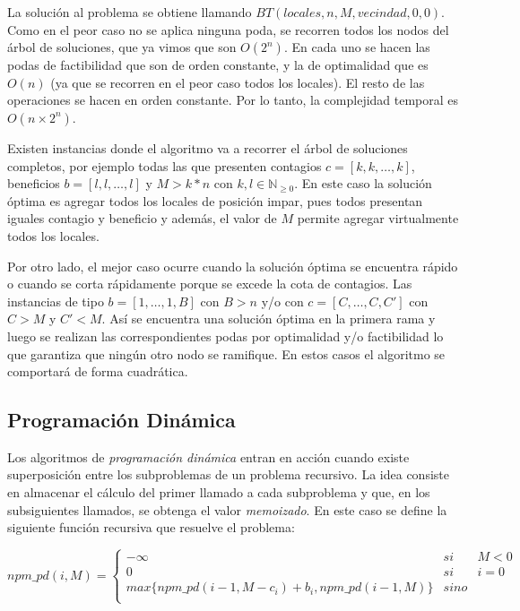 La solución al problema se obtiene llamando $BT(locales, n, M, vecindad, 0, 0)$. Como en el peor caso no se aplica ninguna poda, se recorren todos los nodos del árbol de soluciones, que ya vimos que son $O(2^n)$. En cada uno se hacen las podas de factibilidad que son de orden constante, y la de optimalidad que es $O(n)$ (ya que se recorren en el peor caso todos los locales). El resto de las operaciones se hacen en orden constante. Por lo tanto, la complejidad temporal es $O(n \times 2^n)$.

Existen instancias donde el algoritmo va a recorrer el árbol de soluciones completos, por ejemplo todas las que presenten contagios $c=[k,k,\dots,k]$, beneficios $b=[l,l,\dots,l]$ y $M>k*n$ con $k,l \in \mathbb{N}_{\ge 0}$. En este caso la solución óptima es agregar todos los locales de posición impar, pues todos presentan iguales contagio y beneficio y además, el valor de $M$ permite agregar virtualmente todos los locales.

Por otro lado, el mejor caso ocurre cuando la solución óptima se encuentra rápido o cuando se corta rápidamente porque se excede la cota de contagios. Las instancias de tipo $b=[1,\dots,1,B]$ con $B>n$ y/o con $c=[C,\dots,C,C']$ con $C>M$ y $C'<M$. Así se encuentra una solución óptima en la primera rama y luego se realizan las correspondientes podas por optimalidad y/o factibilidad lo que garantiza que ningún otro nodo se ramifique. En estos casos el algoritmo se comportará de forma cuadrática.

\subsection{Programación Dinámica}

Los algoritmos de \textit{programación dinámica} entran en acción cuando existe superposición entre los subproblemas de un problema recursivo. La idea consiste en almacenar el cálculo del primer llamado a cada subproblema y que, en los subsiguientes llamados, se obtenga el valor \textit{memoizado}. En este caso se define la siguiente función recursiva que resuelve el problema:

\begin{equation}
    npm\_pd(i, M) = 
    \left\{     
        \begin{array}{lcc}
            -\infty & si & M < 0                \\
            0       & si & i = 0                \\
            max \{npm\_pd(i-1, M - c_i) + b_i, npm\_pd(i-1,M) \}   & sino & \\
        \end{array}
    \right.
    \label{eq:npm_pd}
\end{equation}


